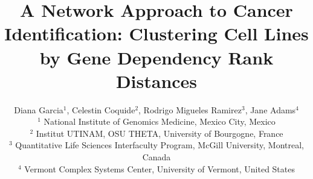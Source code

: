 \documentclass[12pt]{article}
\begin{document}
\title{\normalsize\bf \vspace{-8ex}
A Network Approach to Cancer Identification: Clustering Cell Lines by Gene Dependency Rank Distances}

\author{Diana Garcia$^1$, Celestin Coquide$^2$, Rodrigo Migueles Ramirez$^3$, Jane Adams$^4$\\
$^1$ National Institute of Genomics Medicine, Mexico City, Mexico\\ 
$^2$ Institut UTINAM, OSU THETA, University of Bourgogne, France\\
$^3$ Quantitative Life Sciences Interfaculty Program, McGill University, Montreal, Canada\\
$^4$ Vermont Complex Systems Center, University of Vermont, United States}


\date{\vspace{-5ex}} %

\maketitle

\thispagestyle{empty}
\pagestyle{empty}
\end{document}
